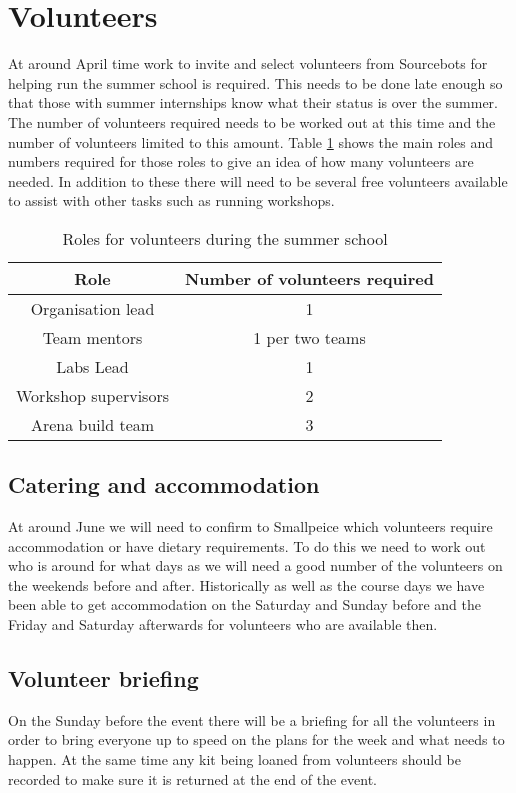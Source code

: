 \section{Volunteers}

At around April time work to invite and select volunteers from Sourcebots for helping run the summer school is required.
This needs to be done late enough so that those with summer internships know what their status is over the summer.
The number of volunteers required needs to be worked out at this time and the number of volunteers limited to this amount.
Table \ref{tab:volunteerroles} shows the main roles and numbers required for those roles to give an idea of how many volunteers are needed.
In addition to these there will need to be several free volunteers available to assist with other tasks such as running workshops.

\begin{table}
    \centering
    \begin{tabular}{cc}
        Role & Number of volunteers required \\
        \hline
        Organisation lead & 1 \\
        Team mentors & 1 per two teams \\
        Labs Lead & 1 \\
        Workshop supervisors & 2 \\
        Arena build team & 3\\
    \end{tabular}
    \caption{Roles for volunteers during the summer school}
    \label{tab:volunteerroles}
\end{table}


\subsection{Catering and accommodation}

At around June we will need to confirm to Smallpeice which volunteers require accommodation or have dietary requirements.
To do this we need to work out who is around for what days as we will need a good number of the volunteers on the weekends before and after.
Historically as well as the course days we have been able to get accommodation on the Saturday and Sunday before and the Friday and Saturday afterwards for volunteers who are available then.


\subsection{Volunteer briefing}

On the Sunday before the event there will be a briefing for all the volunteers in order to bring everyone up to speed on the plans for the week and what needs to happen.
At the same time any kit being loaned from volunteers should be recorded to make sure it is returned at the end of the event.

